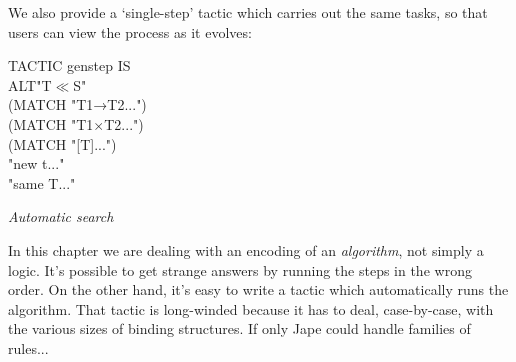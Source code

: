 We also provide a `single-step' tactic which carries out the same tasks, so that users can view the process as it evolves:

TACTIC genstep IS \\
\tab ALT\tab "T$\ll$S" \\
\tab \tab (MATCH "T1→T2{\textbullet}...") \\
\tab \tab (MATCH "T1$\times$T2{\textbullet}...") \\
\tab \tab (MATCH "[T]{\textbullet}...") \\
\tab \tab "new t{\textbullet}..."\\
\tab \tab "same T{\textbullet}..."


\textit{Automatic search}


In this chapter we are dealing with an encoding of an \textit{algorithm}, not simply a logic. It's possible to get strange answers by running the steps in the wrong order. On the other hand, it's easy to write a tactic which automatically runs the algorithm. That tactic is long-winded because it has to deal, case-by-case, with the various sizes of binding structures. If only Jape could handle families of rules...

